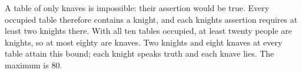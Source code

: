 A table of only knaves is impossible: their assertion would be true. Every occupied table therefore contains a knight, and each knight\textquotesingle s assertion requires at least two knights there. With all ten tables occupied, at least twenty people are knights, so at most eighty are knaves. Two knights and eight knaves at every table attain this bound; each knight speaks truth and each knave lies. The maximum is $\boxed{80}$.
